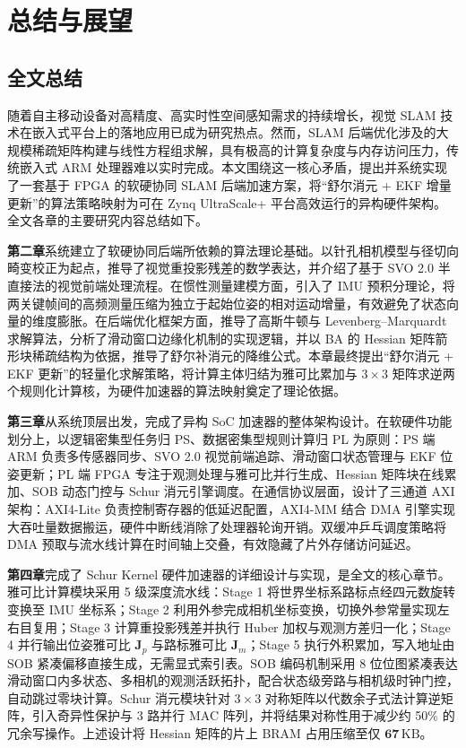 \chapter{总结与展望}\label{chap:conclusion}

\section{全文总结}

随着自主移动设备对高精度、高实时性空间感知需求的持续增长，视觉 SLAM 技术在嵌入式平台上的落地应用已成为研究热点。然而，SLAM 后端优化涉及的大规模稀疏矩阵构建与线性方程组求解，具有极高的计算复杂度与内存访问压力，传统嵌入式 ARM 处理器难以实时完成。本文围绕这一核心矛盾，提出并系统实现了一套基于 FPGA 的软硬协同 SLAM 后端加速方案，将“舒尔消元 + EKF 增量更新”的算法策略映射为可在 Zynq UltraScale+ 平台高效运行的异构硬件架构。全文各章的主要研究内容总结如下。

\textbf{第二章}系统建立了软硬协同后端所依赖的算法理论基础。以针孔相机模型与径切向畸变校正为起点，推导了视觉重投影残差的数学表达，并介绍了基于 SVO 2.0 半直接法的视觉前端处理流程。在惯性测量建模方面，引入了 IMU 预积分理论，将两关键帧间的高频测量压缩为独立于起始位姿的相对运动增量，有效避免了状态向量的维度膨胀。在后端优化框架方面，推导了高斯牛顿与 Levenberg--Marquardt 求解算法，分析了滑动窗口边缘化机制的实现逻辑，并以 BA 的 Hessian 矩阵箭形块稀疏结构为依据，推导了舒尔补消元的降维公式。本章最终提出“舒尔消元 + EKF 更新”的轻量化求解策略，将计算主体归结为雅可比累加与 $3 \times 3$ 矩阵求逆两个规则化计算核，为硬件加速器的算法映射奠定了理论依据。

\textbf{第三章}从系统顶层出发，完成了异构 SoC 加速器的整体架构设计。在软硬件功能划分上，以逻辑密集型任务归 PS、数据密集型规则计算归 PL 为原则：PS 端 ARM 负责多传感器同步、SVO 2.0 视觉前端追踪、滑动窗口状态管理与 EKF 位姿更新；PL 端 FPGA 专注于观测处理与雅可比并行生成、Hessian 矩阵块在线累加、SOB 动态门控与 Schur 消元引擎调度。在通信协议层面，设计了三通道 AXI 架构：AXI4-Lite 负责控制寄存器的低延迟配置，AXI4-MM 结合 DMA 引擎实现大吞吐量数据搬运，硬件中断线消除了处理器轮询开销。双缓冲乒乓调度策略将 DMA 预取与流水线计算在时间轴上交叠，有效隐藏了片外存储访问延迟。

\textbf{第四章}完成了 Schur Kernel 硬件加速器的详细设计与实现，是全文的核心章节。雅可比计算模块采用 5 级深度流水线：Stage 1 将世界坐标系路标点经四元数旋转变换至 IMU 坐标系；Stage 2 利用外参完成相机坐标变换，切换外参常量实现左右目复用；Stage 3 计算重投影残差并执行 Huber 加权与观测方差归一化；Stage 4 并行输出位姿雅可比 $\mathbf{J}_p$ 与路标雅可比 $\mathbf{J}_m$；Stage 5 执行外积累加，写入地址由 SOB 紧凑偏移直接生成，无需显式索引表。SOB 编码机制采用 8 位位图紧凑表达滑动窗口内多状态、多相机的观测活跃拓扑，配合状态级旁路与相机级时钟门控，自动跳过零块计算。Schur 消元模块针对 $3 \times 3$ 对称矩阵以代数余子式法计算逆矩阵，引入奇异性保护与 3 路并行 MAC 阵列，并将结果对称性用于减少约 50\% 的冗余写操作。上述设计将 Hessian 矩阵的片上 BRAM 占用压缩至仅 $\mathbf{67\,\mathrm{KB}}$。

